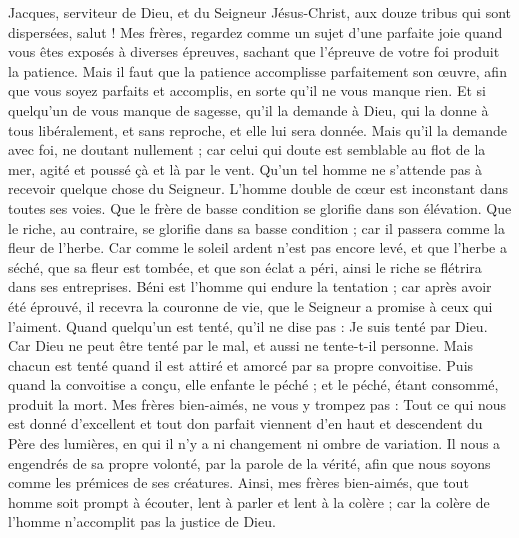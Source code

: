 \begin{multicols}{2}
\VerseOne{}Jacques, serviteur de Dieu, et du Seigneur Jésus-Christ, aux douze tribus qui sont dispersées, salut !
Mes frères, regardez comme un sujet d'une parfaite joie quand vous êtes exposés à diverses épreuves,
sachant que l'épreuve de votre foi produit la patience.
Mais il faut que la patience accomplisse parfaitement son œuvre, afin que vous soyez parfaits et accomplis, en sorte qu'il ne vous manque rien.
Et si quelqu'un de vous manque de sagesse, qu'il la demande à Dieu, qui la donne à tous libéralement, et sans reproche, et elle lui sera donnée.
Mais qu'il la demande avec foi, ne doutant nullement ; car celui qui doute est semblable au flot de la mer, agité et poussé çà et là par le vent.
Qu'un tel homme ne s'attende pas à recevoir quelque chose du Seigneur.
L'homme double de cœur est inconstant dans toutes ses voies.
Que le frère de basse condition se glorifie dans son élévation.
Que le riche, au contraire, se glorifie dans sa basse condition ; car il passera comme la fleur de l'herbe.
Car comme le soleil ardent n'est pas encore levé, et que l'herbe a séché, que sa fleur est tombée, et que son éclat a péri, ainsi le riche se flétrira dans ses entreprises.
Béni est l'homme qui endure la tentation ; car après avoir été éprouvé, il recevra la couronne de vie, que le Seigneur a promise à ceux qui l'aiment.
Quand quelqu'un est tenté, qu'il ne dise pas : Je suis tenté par Dieu. Car Dieu ne peut être tenté par le mal, et aussi ne tente-t-il personne.
Mais chacun est tenté quand il est attiré et amorcé par sa propre convoitise.
Puis quand la convoitise a conçu, elle enfante le péché ; et le péché, étant consommé, produit la mort.
Mes frères bien-aimés, ne vous y trompez pas :
Tout ce qui nous est donné d'excellent et tout don parfait viennent d'en haut et descendent du Père des lumières, en qui il n'y a ni changement ni ombre de variation.
Il nous a engendrés de sa propre volonté, par la parole de la vérité, afin que nous soyons comme les prémices de ses créatures.
Ainsi, mes frères bien-aimés, que tout homme soit prompt à écouter, lent à parler et lent à la colère ;
car la colère de l'homme n'accomplit pas la justice de Dieu.

\end{multicols}
